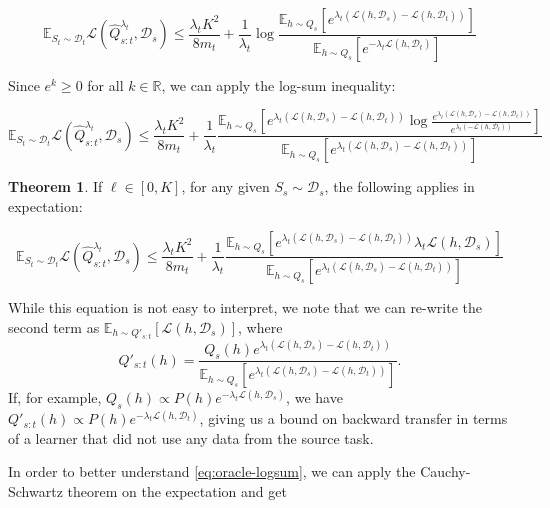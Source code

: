 \documentclass[letterpaper]{article}
\theoremstyle{definition}
\newtheorem{theorem}{Theorem}
\begin{document}
$$
\mathbb{E}_{S_t\sim \mathcal{D}_t}\mathcal{L}( \hat{Q}^{\lambda_t}_{s:t},\mathcal{D}_s)\leq \frac{\lambda_t K^2}{8m_t}+\frac{1}{\lambda_t}\log\frac{\mathbb{E}_{h\sim Q_s}\left [e^{\lambda_t(\mathcal{L}(h,\mathcal{D}_s)-\mathcal{L}(h,\mathcal{D}_t))} \right ]}{\mathbb{E}_{h\sim Q_s}\left [e^{-\lambda_t\mathcal{L}(h,\mathcal{D}_t)}\right ]}
$$

Since $e^k\geq 0$ for all $k\in \mathbb{R}$, we can apply the log-sum inequality:

$$
\mathbb{E}_{S_t\sim \mathcal{D}_t}\mathcal{L}( \hat{Q}^{\lambda_t}_{s:t},\mathcal{D}_s)\leq \frac{\lambda_t K^2}{8m_t}+\frac{1}{\lambda_t}\frac{\mathbb{E}_{h\sim Q_s}\left [e^{\lambda_t(\mathcal{L}(h,\mathcal{D}_s)-\mathcal{L}(h,\mathcal{D}_t))}\log\frac{e^{\lambda_t(\mathcal{L}(h,\mathcal{D}_s)-\mathcal{L}(h,\mathcal{D}_t))}}{e^{\lambda_t(-\mathcal{L}(h,\mathcal{D}_t))}} \right ]}{\mathbb{E}_{h\sim Q_s}\left [e^{\lambda_t(\mathcal{L}(h,\mathcal{D}_s)-\mathcal{L}(h,\mathcal{D}_t))}\right ]}
$$

\begin{theorem}
If $\ell\in[0,K]$, for any given $S_s\sim \mathcal{D}_s$, the following applies in expectation: 

\begin{equation} \label{eq:oracle-logsum}
\mathbb{E}_{S_t\sim \mathcal{D}_t}\mathcal{L}( \hat{Q}^{\lambda_t}_{s:t},\mathcal{D}_s)\leq \frac{\lambda_t K^2}{8m_t}+\frac{1}{\lambda_t}\frac{\mathbb{E}_{h\sim Q_s}\left [e^{\lambda_t(\mathcal{L}(h,\mathcal{D}_s)-\mathcal{L}(h,\mathcal{D}_t))}\lambda_t\mathcal{L}(h,\mathcal{D}_s) \right ]}{\mathbb{E}_{h\sim Q_s}\left [e^{\lambda_t(\mathcal{L}(h,\mathcal{D}_s)-\mathcal{L}(h,\mathcal{D}_t))}\right ]}
\end{equation}
\end{theorem}

While this equation is not easy to interpret, we note that we can re-write the second term as $\mathbb{E}_{h\sim Q'_{s:t}}\left [\mathcal{L}(h,\mathcal{D}_s) \right ]$, where $$Q'_{s:t}(h)=\frac{Q_s(h)e^{\lambda_t(\mathcal{L}(h,\mathcal{D}_s)-\mathcal{L}(h,\mathcal{D}_t))}}{\mathbb{E}_{h\sim Q_s}\left [e^{\lambda_t(\mathcal{L}(h,\mathcal{D}_s)-\mathcal{L}(h,\mathcal{D}_t))}\right ]} .$$
If, for example, $Q_s(h)\propto P(h)e^{-\lambda_t\mathcal{L}(h,\mathcal{D}_s)}$, we have $Q'_{s:t}(h)\propto  P(h)e^{-\lambda_t\mathcal{L}(h,\mathcal{D}_t)}$, giving us a bound on backward transfer in terms of a learner that did not use any data from the source task.

In order to better understand \eqref{eq:oracle-logsum}, we can apply the Cauchy-Schwartz theorem on the expectation and get
\end{document}

